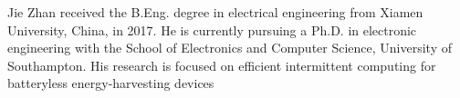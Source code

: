 \documentclass[journal, twoside]{IEEEtran}
\begin{document}




%



% 

\vspace{-6\baselineskip}

\begin{IEEEbiography}{Jie Zhan}
received the B.Eng. degree in electrical engineering from Xiamen University, China, in 2017. He is currently pursuing a Ph.D. in electronic engineering with the School of Electronics and Computer Science, University of Southampton. His research is focused on efficient intermittent computing for batteryless energy-harvesting devices
\end{IEEEbiography}
\end{document}
